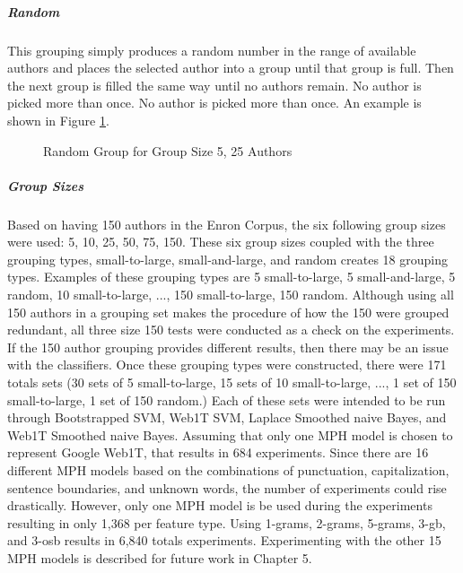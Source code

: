 		\subparagraph{Random} This grouping simply produces a random number in the range of available authors and places the selected author into a group until that group is full.  Then the next group is filled the same way until no authors remain.  No author is picked more than once. No author is picked more than once. An example is shown in Figure \ref{fig:randomGrouping}.
		\begin{figure}[ht!]
			\begin{center}
				\caption{Random Group for Group Size 5, 25 Authors}
				\label{fig:randomGrouping}
			\end{center}
		\end{figure}
		\subparagraph{Group Sizes} Based on having 150 authors in the Enron Corpus, the six following group sizes were used: 5, 10, 25, 50, 75, 150.  These six group sizes coupled with the three grouping types, small-to-large, small-and-large, and random creates 18 grouping types.  Examples of these grouping types are 5 small-to-large, 5 small-and-large, 5 random, 10 small-to-large, ..., 150 small-to-large, 150 random.  Although using all 150 authors in a grouping set makes the procedure of how the 150 were grouped redundant, all three size 150 tests were conducted as a check on the experiments. If the 150 author grouping provides different results, then there may be an issue with the classifiers. Once these grouping types were constructed, there were 171 totals sets (30 sets of 5 small-to-large, 15 sets of 10 small-to-large, ..., 1 set of 150 small-to-large, 1 set of 150 random.)  Each of these sets were intended to be run through Bootstrapped SVM, Web1T SVM, Laplace Smoothed naive Bayes, and Web1T Smoothed naive Bayes.  Assuming that only one MPH model is chosen to represent Google Web1T, that results in 684 experiments.  Since there are 16 different MPH models based on the combinations of punctuation, capitalization, sentence boundaries, and unknown words, the number of experiments could rise drastically.  However, only one MPH model is be used during the experiments resulting in only 1,368 per feature type.  Using 1-grams, 2-grams, 5-grams, 3-gb, and 3-osb results in 6,840 totals experiments.  Experimenting with the other 15 MPH models is described for future work in Chapter 5.
	

